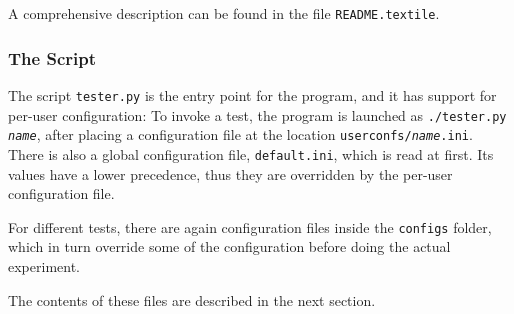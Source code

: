 A comprehensive description can be found in the file {\tt README.textile}.


\subsubsection{The Script}

\noindent
The script \verb|tester.py| is the entry point for the program, and it has support for per-user configuration:
To invoke a test, the program is launched as {\tt ./tester.py \textit{name}},
after placing a configuration file at the location {\tt userconfs/\textit{name}.ini}.
There is also a global configuration file, {\tt default.ini}, which is read at first.
Its values have a lower precedence, thus they are overridden by the per-user configuration file.

For different tests, there are again configuration files inside the {\tt configs} folder,
which in turn override some of the configuration before doing the actual experiment.

The contents of these files are described in the next section.


